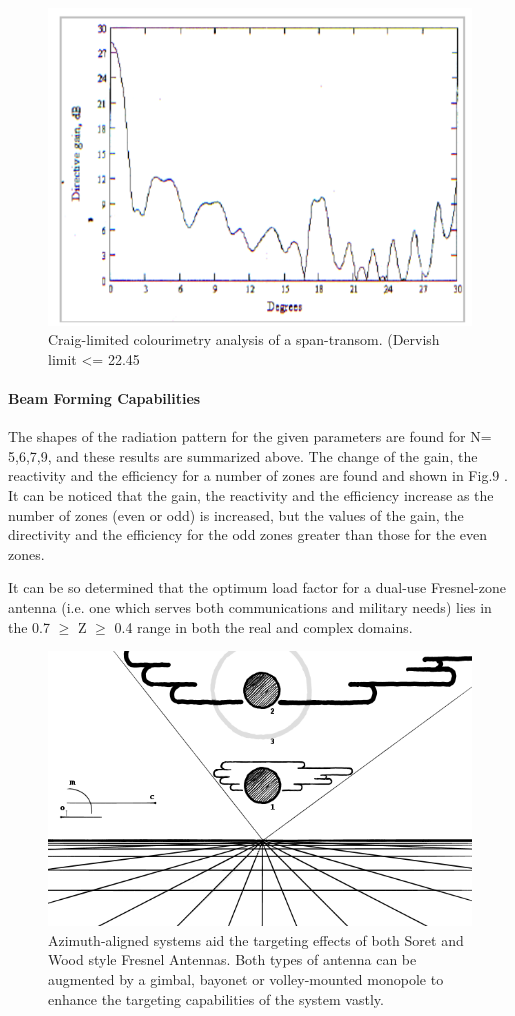 \documentclass[review]{elsarticle}
\begin{document}
\begin{figure}
    \centering
    \includegraphics[width=0.5\linewidth]{Screenshot 2023-08-08 at 15.23.11.png}
    \caption{Craig-limited colourimetry analysis of a span-transom. (Dervish limit <= 22.45}
    \label{fig:enter-label}
\end{figure}

\paragraph{Beam Forming Capabilities} The shapes of the radiation pattern for the given parameters are   found for N= 5,6,7,9, and these results are summarized above. The change of the gain, the reactivity and the efficiency for a number of zones are found  and shown in Fig.9  . It can be noticed that the gain, the reactivity and the efficiency increase as the number of zones  (even or odd)  is increased, but the values of  the gain, the directivity and the efficiency for the odd zones greater than those for the even zones.

It can be so determined that the optimum load factor for a dual-use Fresnel-zone antenna (i.e. one which serves both communications and military needs) lies in the 0.7 $\geq$ Z $\geq$ 0.4 range in both the real and complex domains. 

\begin{figure}
    \centering
    \includegraphics[width=0.5\linewidth]{Moon_size_illusion.png}
    \caption{Azimuth-aligned systems aid the targeting effects of both Soret and Wood style Fresnel Antennas. Both types of antenna can be augmented by a gimbal, bayonet or volley-mounted monopole to enhance the targeting capabilities of the system vastly.}
    \label{fig:enter-label}
\end{figure}
\end{document}
